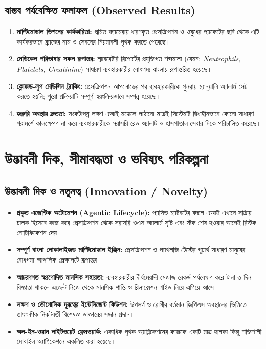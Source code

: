 \documentclass[12pt,a4paper,oneside]{report}
\begin{document}
\section{বাস্তব পর্যবেক্ষিত ফলাফল (Observed Results)}
\begin{enumerate}
    \item \textbf{মাল্টিমোডাল ভিশনের কার্যকারিতা:} প্রমিত ক্যামেরায় ধারণকৃত প্রেসক্রিপশন ও ওষুধের প্যাকেটের ছবি থেকে এটি কার্যকরভাবে ব্র্যান্ডের নাম ও সেবনের নিয়মাবলী পৃথক করতে পেরেছে।
    \item \textbf{মেডিকেল পরিভাষার সফল রূপান্তর:} ল্যাবরেটরি রিপোর্টের প্রযুক্তিগত শব্দমালা (যেমন: \textit{Neutrophils, Platelets, Creatinine}) সাধারণ ব্যবহারকারীর বোধগম্য বাংলায় রূপান্তরিত হয়েছে।
    \item \textbf{ক্লোজড-লুপ মেডিসিন ট্র্যাকিং:} প্রেসক্রিপশন আপলোডের পর ব্যবহারকারীকে পুনরায় ম্যানুয়ালি অ্যালার্ম সেট করতে হয়নি; পুরো প্রক্রিয়াটি সম্পূর্ণ স্বয়ংক্রিয়ভাবে সম্পন্ন হয়েছে।
    \item \textbf{জরুরি অবস্থায় দ্রুততা:} সংকটাপন্ন লক্ষণ এআই মডেলে পাঠানো মাত্রই সিস্টেমটি দ্বিধাহীনভাবে কোনো সাধারণ পরামর্শে কালক্ষেপণ না করে ব্যবহারকারীকে সরাসরি রেড অ্যালার্ট ও হাসপাতাল সেবার দিকে পরিচালিত করেছে।
\end{enumerate}

\chapter{উদ্ভাবনী দিক, সীমাবদ্ধতা ও ভবিষ্যৎ পরিকল্পনা}

\section{উদ্ভাবনী দিক ও নতুনত্ব (Innovation / Novelty)}
\begin{itemize}
    \item \textbf{প্রকৃত এজেন্টিক অটোমেশন (Agentic Lifecycle):} প্যাসিভ চ্যাটবটের বদলে এআই এখানে সক্রিয় চালক হিসেবে কাজ করে প্রেসক্রিপশন থেকে সরাসরি ওএস অ্যালার্ম সৃষ্টি এবং স্টক শেষ হওয়ার আগেই রিস্টক নোটিফিকেশন দেয়।
    \item \textbf{সম্পূর্ণ বাংলা লোকালাইজড মাল্টিমোডাল ইঞ্জিন:} প্রেসক্রিপশন ও প্যাথলজি টেস্টের গূঢ়ার্থ সাধারণ মানুষের বোধগম্য আঞ্চলিক প্রেক্ষাপটে রূপান্তর।
    \item \textbf{আচরণগত স্বপ্রণোদিত মানসিক সহায়তা:} ব্যবহারকারীর দীর্ঘমেয়াদী মেজাজ রেকর্ড পর্যবেক্ষণ করে টানা ৩ দিন বিষণ্ণতা থাকলে এজেন্ট নিজে থেকে মানসিক শান্তি ও রিলাক্সেশন গাইড নিয়ে এগিয়ে আসে।
    \item \textbf{লক্ষণ ও ভৌগোলিক দূরত্বের ইন্টেলিজেন্ট ফিউশন:} উপসর্গ ও রোগীর বর্তমান জিপিএস অবস্থানের ভিত্তিতে তাৎক্ষণিক নিকটবর্তী বিশেষজ্ঞ ডাক্তারের সন্ধান প্রদান।
    \item \textbf{অল-ইন-ওয়ান লাইটওয়েট ফ্রেমওয়ার্ক:} একাধিক পৃথক অ্যাপ্লিকেশনের কাজকে একটি মাত্র হালকা কিন্তু শক্তিশালী মোবাইল অ্যাপ্লিকেশনে একত্রিত করা হয়েছে।
\end{itemize}
\end{document}
